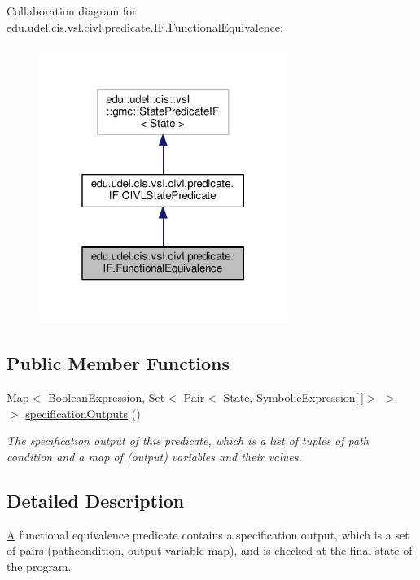 Collaboration diagram for edu.\+udel.\+cis.\+vsl.\+civl.\+predicate.\+I\+F.\+Functional\+Equivalence\+:
\nopagebreak
\begin{figure}[H]
\begin{center}
\leavevmode
\includegraphics[width=229pt]{interfaceedu_1_1udel_1_1cis_1_1vsl_1_1civl_1_1predicate_1_1IF_1_1FunctionalEquivalence__coll__graph}
\end{center}
\end{figure}
\subsection*{Public Member Functions}
\begin{DoxyCompactItemize}
\item 
Map$<$ Boolean\+Expression, Set$<$ \hyperlink{classedu_1_1udel_1_1cis_1_1vsl_1_1civl_1_1util_1_1IF_1_1Pair}{Pair}$<$ \hyperlink{interfaceedu_1_1udel_1_1cis_1_1vsl_1_1civl_1_1state_1_1IF_1_1State}{State}, Symbolic\+Expression\mbox{[}$\,$\mbox{]}$>$ $>$ $>$ \hyperlink{interfaceedu_1_1udel_1_1cis_1_1vsl_1_1civl_1_1predicate_1_1IF_1_1FunctionalEquivalence_a8534f6b8bb5226b1a83477eedf638e61}{specification\+Outputs} ()
\begin{DoxyCompactList}\small\item\em The specification output of this predicate, which is a list of tuples of path condition and a map of (output) variables and their values. \end{DoxyCompactList}\end{DoxyCompactItemize}


\subsection{Detailed Description}
\hyperlink{structA}{A} functional equivalence predicate contains a specification output, which is a set of pairs (pathcondition, output variable map), and is checked at the final state of the program. 

